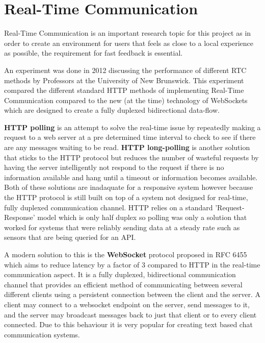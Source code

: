 
\section{Real-Time Communication} \label{lit-rtc}

Real-Time Communication is an important research topic for this project as in order to create an environment for users that feels as close to a local experience as possible, the requirement for fast feedback is essential.

An experiment was done in 2012 discussing the performance of different RTC methods by Professors at the University of New Brunswick\cite{websocket}. This experiment compared the different standard HTTP methods of implementing Real-Time Communication compared to the new (at the time) technology of WebSockets which are designed to create a fully duplexed bidirectional data-flow.

\textbf{HTTP polling} is an attempt to solve the real-time issue by repeatedly making a request to a web server at a pre determined time interval to check to see if there are any messages waiting to be read.  \textbf{HTTP long-polling} is another solution that sticks to the HTTP protocol but reduces the number of wasteful requests by having the server intelligently not respond to the request if there is no information available and hang until a timeout or information becomes available. Both of these solutions are inadaquate for a responsive system however because the HTTP protocol is still built on top of a system not designed for real-time, fully duplexed communication channel. HTTP relies on a standard 'Request-Response' model which is only half duplex so polling was only a solution that worked for systems that were reliably sending data at a steady rate such as sensors that are being queried for an API.

A modern solution to this is the \textbf{WebSocket} protocol proposed in RFC 6455 \cite{wsrfc} which aims to reduce latency by a factor of 3 compared to HTTP in the real-time communication aspect. It is a fully duplexed, bidirectional communication channel that provides an efficient method of communicating between several different clients using a persistent connection between the client and the server. A client may connect to a websocket endpoint on the server, send messages to it, and the server may broadcast messages back to just that client or to every client connected. Due to this behaviour it is very popular for creating text based chat communication systems.

